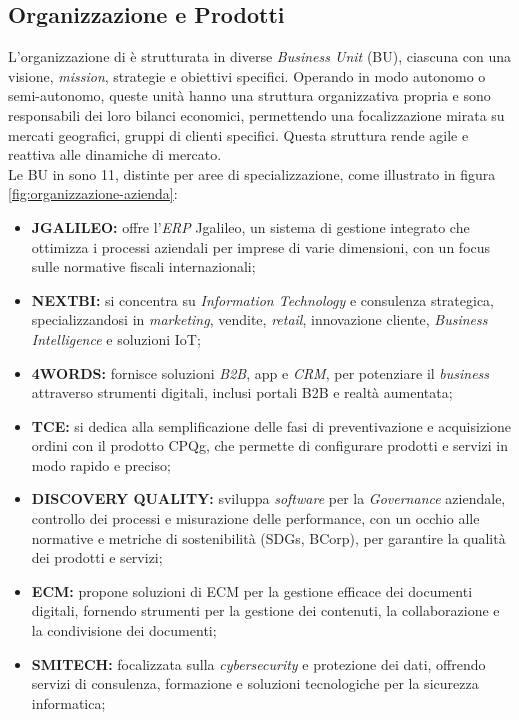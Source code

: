 \subsection{Organizzazione e Prodotti}
L'organizzazione di \azienda{} è strutturata in diverse \textit{Business Unit} (BU), ciascuna con una visione, \textit{mission}, strategie e obiettivi specifici. Operando in modo autonomo o semi-autonomo, 
queste unità hanno una struttura organizzativa propria e sono responsabili dei loro bilanci economici, permettendo una focalizzazione mirata su mercati geografici, gruppi di clienti specifici. 
Questa struttura rende \azienda{} agile e reattiva alle dinamiche di mercato. \\
Le BU in \azienda{} sono 11, distinte per aree di specializzazione, come illustrato in figura \ref{fig:organizzazione-azienda}:
\begin{itemize}
\item \textbf{JGALILEO:} offre l’\textit{\gls{ERP}} Jgalileo, un sistema di gestione integrato che ottimizza i processi aziendali per imprese di varie dimensioni, con un focus sulle normative fiscali internazionali;
\item \textbf{NEXTBI:} si concentra su \textit{Information Technology} e consulenza strategica, specializzandosi in \textit{marketing}, vendite, \textit{retail}, innovazione cliente, \textit{Business Intelligence} e soluzioni \gls{IoT};
\item \textbf{4WORDS:} fornisce soluzioni \textit{\gls{B2B}}, app e \textit{\gls{CRM}}, per potenziare il \textit{business} attraverso strumenti digitali, inclusi portali B2B e realtà aumentata;
\item \textbf{TCE:} si dedica alla semplificazione delle fasi di preventivazione e acquisizione ordini con il prodotto \gls{CPQg}, che permette di configurare prodotti e servizi in modo rapido e preciso;
\item \textbf{DISCOVERY QUALITY:} sviluppa \textit{software} per la \textit{Governance} aziendale, controllo dei processi e misurazione delle performance, con un occhio alle normative e metriche di sostenibilità (\gls{SDGs}, \gls{BCorp}), per garantire la qualità dei prodotti e servizi;
\item \textbf{ECM:} propone soluzioni di \gls{ECM} per la gestione efficace dei documenti digitali, fornendo strumenti per la gestione dei contenuti, la collaborazione e la condivisione dei documenti;
\item \textbf{SMITECH:} focalizzata sulla \textit{\gls{cybersecurity}} e protezione dei dati, offrendo servizi di consulenza, formazione e soluzioni tecnologiche per la sicurezza informatica;

\end{itemize}
